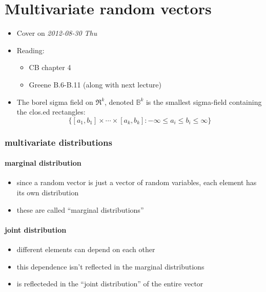 
\part{Multivariate random vectors}

\begin{itemize}
\item Cover on \textit{2012-08-30 Thu}
\item Reading:
\begin{itemize}
\item CB chapter 4
\item Greene B.6-B.11 (along with next lecture)
\end{itemize}
\item The borel sigma field on $\Re^k$, denoted $\mathbb{B}^k$ is the
     smallest sigma-field containing the clos.ed
     rectangles: \[\{[a_1,b_1] \times \cdots \times [a_k,b_k] : -
     \infty \leq a_i \leq b_i \leq \infty\}\]
\end{itemize}
\section{multivariate distributions}
\label{sec-1}
\subsection{marginal distribution}
\label{sec-1-1}

\begin{itemize}
\item since a random vector is just a vector of random variables, each
       element has its own distribution
\item these are called ``marginal distributions''
\end{itemize}
\subsection{joint distribution}
\label{sec-1-2}

\begin{itemize}
\item different elements can depend on each other
\item this dependence isn't reflected in the marginal distributions
\item is reflecteded in the ``joint distribution'' of the entire vector
\end{itemize}
